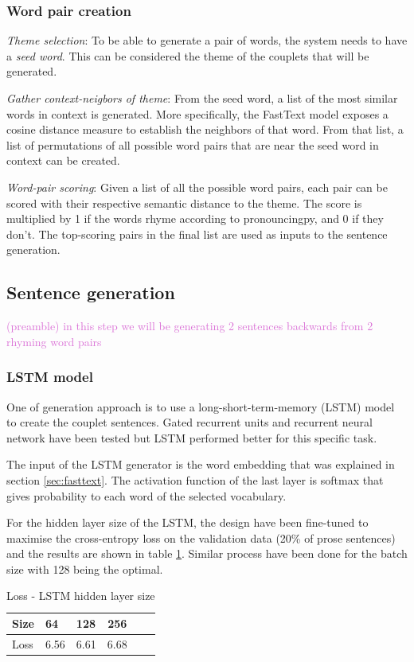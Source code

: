\documentclass[11pt,a4paper]{article}
\newenvironment{tight_enumerate}{
\begin{enumerate}
\setlength{\itemsep}{0pt}
\setlength{\parskip}{0pt}
}{\end{enumerate}}
\begin{document}
\subsubsection{Word pair creation}
\begin{tight_enumerate}
	\item \textit{Theme selection}: To be able to generate a pair of words, the system needs to have a \textit{seed word}. This can be considered the theme of the couplets that will be generated.
	\item \textit{Gather context-neigbors of theme}: From the seed word, a list of the most similar words in context is generated. More specifically, the FastText model exposes a cosine distance measure to establish the neighbors of that word. From that list, a list of permutations of all possible word pairs that are near the seed word in context can be created.
	\item \textit{Word-pair scoring}: Given a list of all the possible word pairs, each pair can be scored with their respective semantic distance to the theme. The score is multiplied by 1 if the words rhyme according to pronouncingpy, and 0 if they don't. The top-scoring pairs in the final list are used as inputs to the sentence generation.
\end{tight_enumerate}

\subsection{Sentence generation}
\label{sec:languagegen}

\textcolor{Orchid}{
	(preamble) in this step we will be generating 2 sentences backwards from 2 rhyming word pairs
}

\subsubsection{LSTM model}
\label{sec:lstm}
One of generation approach is to use a long-short-term-memory (LSTM) model \cite{lstm} to create the couplet sentences. Gated recurrent units and recurrent neural network have been tested but LSTM performed better for this specific task.

The input of the LSTM generator is the word embedding that was explained in section \ref{sec:fasttext}. The activation function of the last layer is softmax that gives probability to each word of the selected vocabulary. 

For the hidden layer size of the LSTM, the design have been fine-tuned to maximise the cross-entropy loss on the validation data (20\% of prose sentences) and the results are shown in table \ref{table:HiddenLayerSizeLSTM}. Similar process have been done for the batch size with 128 being the optimal.
\begin{table}[ht]
\centering
\begin{tabular}{lll c c c}
	\hline\hline
	Size & 64 & 128 & 256 \\ [0.5ex]
	\hline
	Loss & 6.56 & 6.61 & 6.68 \\ [0.5ex]
	\hline\hline
\end{tabular}
\caption{Loss - LSTM hidden layer size}
\label{table:HiddenLayerSizeLSTM}
\end{table}
\end{document}

